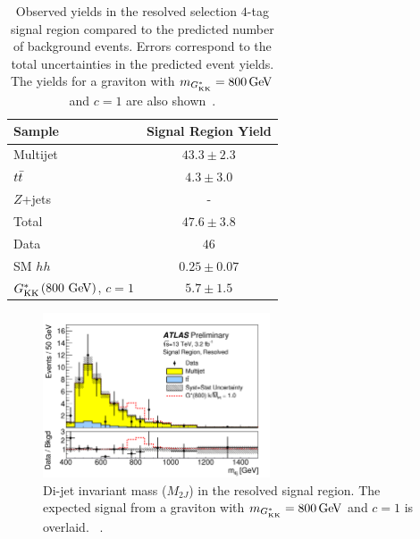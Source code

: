 \begin{table}[!ht]
\captionsetup{justification=centering}
\begin{center}
\begin{tabular}{ l c  }
\toprule
 Sample      & Signal Region Yield \\ 
\midrule
Multijet     & $43.3 \pm 2.3$   \\
$t\bar{t}$       &  $4.3 \pm 3.0$   \\
$Z$+jets     &  -           \\
\midrule
Total        & $47.6 \pm 3.8$   \\
 \midrule
Data         & $46$    \\
\midrule
SM $hh$ & $0.25 \pm 0.07$ \\
$G^*_{\rm KK}$$\left(800\,\rm{\GeV}\right)$, $c = 1$ & $5.7 \pm 1.5$ \\
\bottomrule
\end{tabular}
\caption{Observed yields in the resolved selection $4$-tag signal region compared to the predicted number of background events.
  Errors correspond to the total uncertainties in the predicted event yields. The yields for a graviton with $m_{\Gkk} = 800\GeV$ and $c = 1$ are also shown~\cite{4bconf}.}
\label{tab:ResolvedResults} 
\end{center}
\end{table}

\begin{figure}[h!]
  \centering
  \captionsetup{justification=centering}

  \includegraphics[width=0.6\textwidth]{figures/Resolved_signal}


   \caption{Di-jet invariant mass ($M_{2J}$) in the resolved signal region. The expected signal from a graviton with $m_{\Gkk} = 800 \GeV$ and $c=1$ is overlaid. ~\cite{4bconf}.}
  \label{fig:ResolvedResults}
\end{figure}

